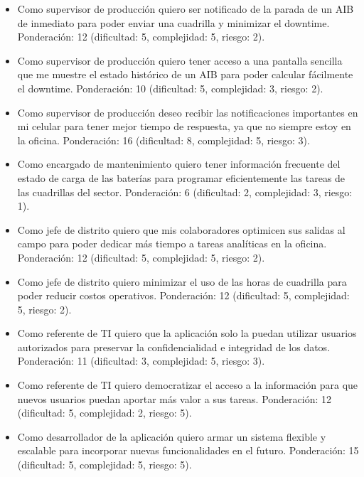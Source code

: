 \documentclass[
11pt, %
]{charter}
\begin{document}
\begin{itemize}

\item Como supervisor de producción quiero ser notificado de la parada de un AIB de inmediato para poder enviar una cuadrilla y minimizar el downtime. Ponderación: 12 (dificultad: 5, complejidad: 5, riesgo: 2).

\item Como supervisor de producción quiero tener acceso a una pantalla sencilla que me muestre el estado histórico de un AIB para poder calcular fácilmente el downtime. Ponderación: 10 (dificultad: 5, complejidad: 3, riesgo: 2).

\item Como supervisor de producción deseo recibir las notificaciones importantes en mi celular para tener mejor tiempo de respuesta, ya que no siempre estoy en la oficina. Ponderación: 16 (dificultad: 8, complejidad: 5, riesgo: 3).

\item Como encargado de mantenimiento quiero tener información frecuente del estado de carga de las baterías para programar eficientemente las tareas de las cuadrillas del sector. Ponderación: 6 (dificultad: 2, complejidad: 3, riesgo: 1).

\item Como jefe de distrito quiero que mis colaboradores optimicen sus salidas al campo para poder dedicar más tiempo a tareas analíticas en la oficina. Ponderación: 12 (dificultad: 5, complejidad: 5, riesgo: 2).

\item Como jefe de distrito quiero minimizar el uso de las horas de cuadrilla para poder reducir costos operativos. Ponderación: 12 (dificultad: 5, complejidad: 5, riesgo: 2).

\item Como referente de TI quiero que la aplicación solo la puedan utilizar usuarios autorizados para preservar la confidencialidad e integridad de los datos. Ponderación: 11 (dificultad: 3, complejidad: 5, riesgo: 3).

\item Como referente de TI quiero democratizar el acceso a la información para que nuevos usuarios puedan aportar más valor a sus tareas. Ponderación: 12 (dificultad: 5, complejidad: 2, riesgo: 5).

\item Como desarrollador de la aplicación quiero armar un sistema flexible y escalable para incorporar nuevas funcionalidades en el futuro. Ponderación: 15 (dificultad: 5, complejidad: 5, riesgo: 5).
\end{itemize}
\end{document}
